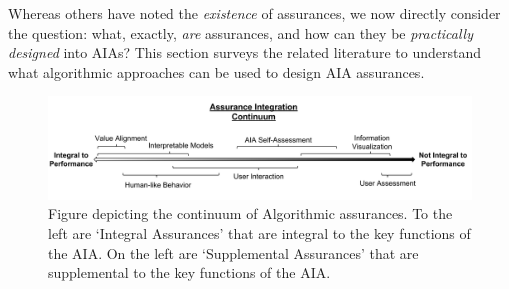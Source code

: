     Whereas others have noted the \textit{existence} of assurances, we now directly consider the question: what, exactly, \textit{are} assurances, and how can they be \textit{practically designed} into AIAs? 
    This section surveys the related literature to understand what algorithmic approaches can be used to design AIA assurances. 
    

    \begin{figure}[b]%
        \centering
        \includegraphics[width=1.0\textwidth]{Figures/Assurance_Integration.pdf}
        \caption{Figure depicting the continuum of Algorithmic assurances. To the left are `Integral Assurances' that are integral to the key functions of the AIA. On the left are `Supplemental Assurances' that are supplemental to the key functions of the AIA. }
        \label{fig:assurance_continuum}
    \end{figure}









